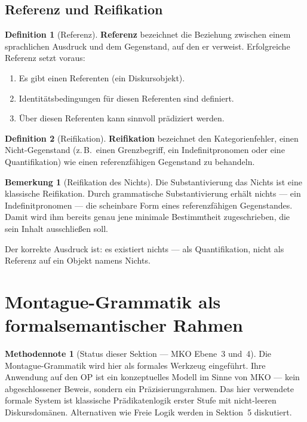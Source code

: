 \documentclass[11pt,a4paper]{article}
\theoremstyle{plain}
\theoremstyle{definition}
\newtheorem{definition}{Definition}[section]
\newtheorem{remark}{Bemerkung}[section]
\newtheorem{methodennote}{Methodennote}[section]
\begin{document}
\subsection{Referenz und Reifikation}

\begin{definition}[Referenz]
\textbf{Referenz} bezeichnet die Beziehung zwischen einem sprachlichen Ausdruck und
dem Gegenstand, auf den er verweist. Erfolgreiche Referenz setzt voraus:
\begin{enumerate}
  \item Es gibt einen Referenten (ein Diskursobjekt).
  \item Identit\"{a}tsbedingungen f\"{u}r diesen Referenten sind definiert.
  \item \"{U}ber diesen Referenten kann sinnvoll pr\"{a}diziert werden.
\end{enumerate}
\end{definition}

\begin{definition}[Reifikation]
\textbf{Reifikation} bezeichnet den Kategorienfehler, einen Nicht-Gegenstand
(z.\,B.\ einen Grenzbegriff, ein Indefinitpronomen oder eine Quantifikation) wie
einen referenzf\"{a}higen Gegenstand zu behandeln.
\end{definition}

\begin{remark}[Reifikation des Nichts]
Die Substantivierung \glqq{}das Nichts\grqq{} ist eine klassische Reifikation. Durch
grammatische Substantivierung erh\"{a}lt \glqq{}nichts\grqq{} --- ein Indefinitpronomen
--- die scheinbare Form eines referenzf\"{a}higen Gegenstandes. Damit wird ihm bereits
genau jene minimale Bestimmtheit zugeschrieben, die sein Inhalt ausschlie\ss{}en soll.

Der korrekte Ausdruck ist: \glqq{}es existiert nichts\grqq{} --- als Quantifikation,
nicht als Referenz auf ein Objekt namens \glqq{}Nichts\grqq{}.
\end{remark}

\section{Montague-Grammatik als formalsemantischer Rahmen}

\begin{methodennote}[Status dieser Sektion --- MKO Ebene~3 und~4]
Die Montague-Grammatik wird hier als formales Werkzeug eingef\"{u}hrt. Ihre Anwendung
auf den OP ist ein konzeptuelles Modell im Sinne von MKO --- kein abgeschlossener
Beweis, sondern ein Pr\"{a}zisierungsrahmen. Das hier verwendete formale System ist
klassische Pr\"{a}dikatenlogik erster Stufe mit nicht-leeren Diskursdom\"{a}nen.
Alternativen wie Freie Logik werden in Sektion~5 diskutiert.
\end{methodennote}
\end{document}
